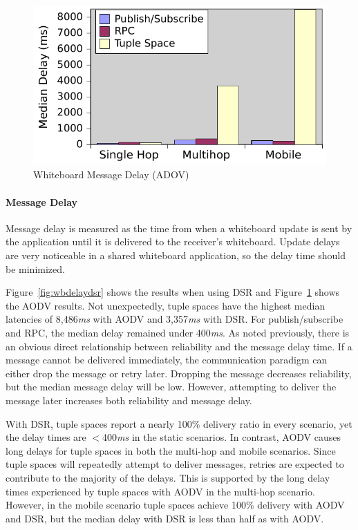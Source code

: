 \begin{figure}
\centering
\includegraphics[scale = 1, clip, trim = 6px 0px 2px 3px]{figures/wb-aodv-delay.pdf}
\caption{Whiteboard Message Delay (ADOV)}
\label{fig:wbdelayaodv}
\end{figure}

\paragraph{Message Delay}

Message delay is measured as the time from when a whiteboard update is sent by the application until it is delivered to the receiver's whiteboard. Update delays are very noticeable in a shared whiteboard application, so the delay time should be minimized.

Figure~\ref{fig:wbdelaydsr} shows the results when using DSR and Figure~\ref{fig:wbdelayaodv} shows the AODV results. Not unexpectedly, tuple spaces have the highest median latencies of 8,486\textit{ms} with AODV and 3,357\textit{ms} with DSR. For publish/subscribe and RPC, the median delay remained under 400\textit{ms}. As noted previously, there is an obvious direct relationship between reliability and the message delay time. If a message cannot be delivered immediately, the communication paradigm can either drop the message or retry later. Dropping the message decreases reliability, but the median message delay will be low. However, attempting to deliver the message later increases both reliability and message delay.

With DSR, tuple spaces report a nearly 100\% delivery ratio in every scenario, yet the delay times are $<$400\textit{ms} in the static scenarios. In contrast, AODV causes long delays for tuple spaces in both the multi-hop and mobile scenarios. Since tuple spaces will repeatedly attempt to deliver messages, retries are expected to contribute to the majority of the delays. This is supported by the long delay times experienced by tuple spaces with AODV in the multi-hop scenario. However, in the mobile scenario tuple spaces achieve 100\% delivery with AODV and DSR, but the median delay with DSR is less than half as with AODV.


